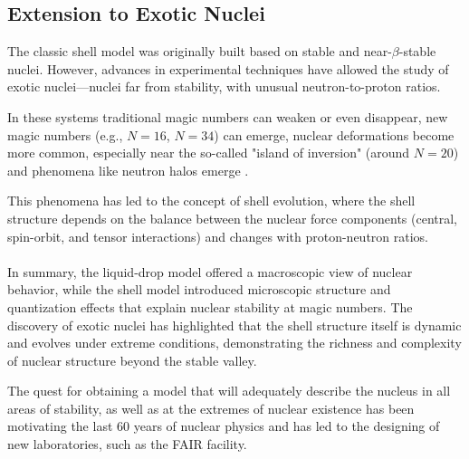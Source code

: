 \subsection{Extension to Exotic Nuclei}

The classic shell model was originally built based on stable and near-$\beta$-stable nuclei. However, advances in experimental techniques have allowed the study of exotic nuclei—nuclei far from stability, with unusual neutron-to-proton ratios.



In these systems traditional magic numbers can weaken or even disappear, new magic numbers (e.g., $N=16$, $N=34$) can emerge, nuclear deformations become more common, especially near the so-called "island of inversion" (around $N=20$) and phenomena like neutron halos emerge \cite{otsuka_evolution_2020}.

This phenomena has led to the concept of shell evolution, where the shell structure depends on the balance between the nuclear force components (central, spin-orbit, and tensor interactions) and changes with proton-neutron ratios.
\\
\\
In summary, the liquid-drop model offered a macroscopic view of nuclear behavior, while the shell model introduced microscopic structure and quantization effects that explain nuclear stability at magic numbers. The discovery of exotic nuclei has highlighted that the shell structure itself is dynamic and evolves under extreme conditions, demonstrating the richness and complexity of nuclear structure beyond the stable valley.

The quest for obtaining a model that will adequately describe the nucleus in all areas of stability, as well as at the extremes of nuclear existence has been motivating the last 60 years of nuclear physics and has led to the designing of new laboratories, such as the FAIR facility.


